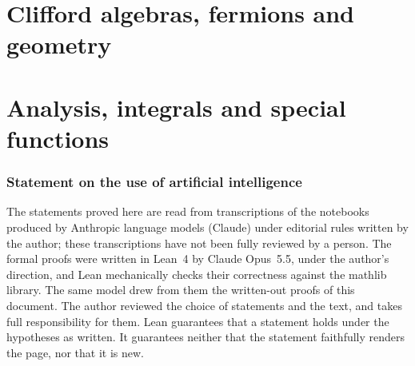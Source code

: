 \documentclass[11pt]{article}
\theoremstyle{plain}
\theoremstyle{definition}
\theoremstyle{remark}
\renewcommand{\_}{\bkunderscore\allowbreak}
\begin{document}
\part{Clifford algebras, fermions and geometry}







\part{Analysis, integrals and special functions}











\clearpage{}%
\section*{Statement on the use of artificial intelligence}

The statements proved here are read from transcriptions of the notebooks produced by Anthropic language models (Claude) under editorial rules written by the author; these transcriptions have not been fully reviewed by a person. The formal proofs were written in Lean~4 by Claude Opus~5.5, under the author's direction, and Lean mechanically checks their correctness against the mathlib library. The same model drew from them the written-out proofs of this document. The author reviewed the choice of statements and the text, and takes full responsibility for them. Lean guarantees that a statement holds under the hypotheses as written. It guarantees neither that the statement faithfully renders the page, nor that it is new.
\end{document}

